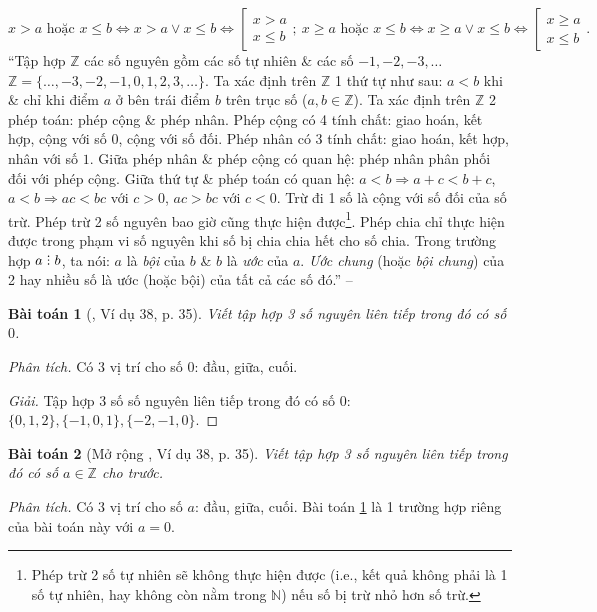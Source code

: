\documentclass{article}
\numberwithin{equation}{section}
\newtheorem{baitoan}{Bài toán}
\DeclareRobustCommand{\divby}{%
	\mathrel{\vbox{\baselineskip.65ex\lineskiplimit0pt\hbox{.}\hbox{.}\hbox{.}}}%
}
\begin{document}
\begin{equation*}
	x > a \mbox{ hoặc } x\le b\Leftrightarrow x > a\lor x\le b\Leftrightarrow\left[\begin{split}
		x > a\\x\le b
	\end{split}\right.;\ x\ge a \mbox{ hoặc } x\le b\Leftrightarrow x\ge a\lor x\le b\Leftrightarrow\left[\begin{split}
		x\ge a\\x\le b
	\end{split}\right..
\end{equation*}
``Tập hợp $\mathbb{Z}$ các số nguyên gồm các số tự nhiên \& các số $-1,-2,-3,\ldots$ $\mathbb{Z} = \{\ldots,-3,-2,-1,0,1,2,3,\ldots\}$. Ta xác định trên $\mathbb{Z}$ 1 thứ tự như sau: $a < b$ khi \& chỉ khi điểm $a$ ở bên trái điểm $b$ trên trục số ($a,b\in\mathbb{Z}$). Ta xác định trên $\mathbb{Z}$ 2 phép toán: phép cộng \& phép nhân. Phép cộng có 4 tính chất: giao hoán, kết hợp, cộng với số $0$, cộng với số đối. Phép nhân có 3 tính chất: giao hoán, kết hợp, nhân với số $1$. Giữa phép nhân \& phép cộng có quan hệ: phép nhân phân phối đối với phép cộng. Giữa thứ tự \& phép toán có quan hệ: $a < b\Rightarrow a + c < b + c$, $a < b\Rightarrow ac < bc$ với $c > 0$, $ac > bc$ với $c < 0$. Trừ đi 1 số là cộng với số đối của số trừ. Phép trừ 2 số nguyên bao giờ cũng thực hiện được\footnote{Phép trừ 2 số tự nhiên sẽ không thực hiện được (i.e., kết quả không phải là 1 số tự nhiên, hay không còn nằm trong $\mathbb{N}$) nếu số bị trừ nhỏ hơn số trừ.}. Phép chia chỉ thực hiện được trong phạm vi số nguyên khi số bị chia chia hết cho số chia. Trong trường hợp $a\divby b$, ta nói: $a$ là \textit{bội} của $b$ \& $b$ là \textit{ước} của $a$. \textit{Ước chung} (hoặc \textit{bội chung}) của 2 hay nhiều số là ước (hoặc bội) của tất cả các số đó.'' -- \cite[Chap. II, p. 41]{Binh_Toan_6_tap_1}

\begin{baitoan}[\cite{Tuyen_Toan_6}, Ví dụ 38, p. 35]
	\label{Ví dụ 38, p. 35}
	Viết tập hợp 3 số nguyên liên tiếp trong đó có số $0$.
\end{baitoan}
\noindent\textit{Phân tích.} Có 3 vị trí cho số $0$: đầu, giữa, cuối.

\begin{proof}[Giải]
	Tập hợp 3 số số nguyên liên tiếp trong đó có số $0$: $\{0,1,2\},\{-1,0,1\},\{-2,-1,0\}$.
\end{proof}

\begin{baitoan}[Mở rộng \cite{Tuyen_Toan_6}, Ví dụ 38, p. 35]
	\label{Mở rộng Ví dụ 38, p. 35}
	Viết tập hợp 3 số nguyên liên tiếp trong đó có số $a\in\mathbb{Z}$ cho trước.
\end{baitoan}
\noindent\textit{Phân tích.} Có 3 vị trí cho số $a$: đầu, giữa, cuối. Bài toán \ref{Ví dụ 38, p. 35} là 1 trường hợp riêng của bài toán này với $a = 0$.
\end{document}
